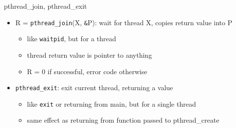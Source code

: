 
\begin{frame}[fragile]{pthread\_join, pthread\_exit}
\begin{itemize}
\item R = \texttt{pthread\_join}(X, \verb|&|P): wait for thread X, copies return value into P
    \begin{itemize}
    \item like \texttt{waitpid}, but for a thread
    \item thread return value is pointer to anything
    \item R = 0 if successful, error code otherwise
    \end{itemize}
\item \texttt{pthread\_exit}: exit current thread, returning a value
    \begin{itemize}
    \item like \texttt{exit} or returning from main, but for a single thread
    \item same effect as returning from function passed to pthread\_create
    \end{itemize}
\end{itemize}
\end{frame}
